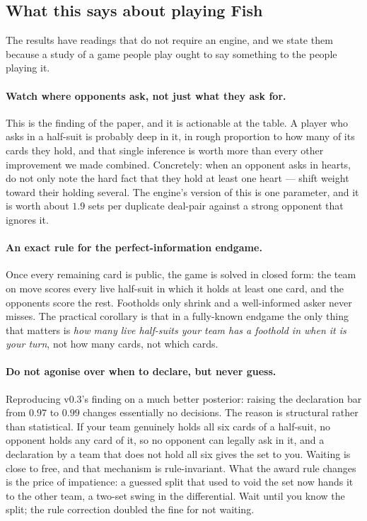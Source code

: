 \documentclass[11pt,letterpaper]{article}
\begin{document}
\subsection{What this says about playing Fish}
\label{sec:strategy}

The results have readings that do not require an engine, and we state them
because a study of a game people play ought to say something to the people
playing it.

\paragraph{Watch where opponents ask, not just what they ask for.} This is the
finding of the paper, and it is actionable at the table. A player who asks in a
half-suit is probably deep in it, in rough proportion to how many of its cards
they hold, and that single inference is worth more than every other improvement
we made combined. Concretely: when an opponent asks in hearts, do not only note
the hard fact that they hold at least one heart --- shift weight toward their
holding several. The engine's version of this is one parameter, and it is worth
about $1.9$ sets per duplicate deal-pair against a strong opponent that ignores
it.

\paragraph{An exact rule for the perfect-information endgame.} Once every
remaining card is public, the game is solved in closed form: the team on move
scores every live half-suit in which it holds at least one card, and the
opponents score the rest. Footholds only shrink and a well-informed asker never
misses. The practical corollary is that in a fully-known endgame the only thing
that matters is \emph{how many live half-suits your team has a foothold in when
it is your turn}, not how many cards, not which cards.

\paragraph{Do not agonise over when to declare, but never guess.}
Reproducing v0.3's finding on a much better posterior: raising the
declaration bar from $0.97$ to $0.99$ changes essentially no decisions. The
reason is structural rather than statistical. If your team genuinely holds
all six cards of a half-suit, no opponent holds any card of it, so no
opponent can legally ask in it, and a declaration by a team that does not
hold all six gives the set to you. Waiting is close to free, and that
mechanism is rule-invariant. What the award rule changes is the price of
impatience: a guessed split that used to void the set now hands it to the
other team, a two-set swing in the differential. Wait until you know the
split; the rule correction doubled the fine for not waiting.
\end{document}
